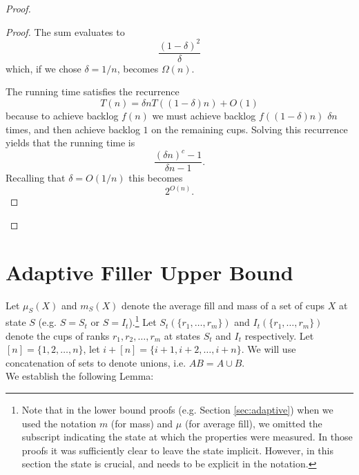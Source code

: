 \documentclass[twocolumn]{article}[10pt]
\begin{document}
\begin{proof}
\begin{proof}
    The sum evaluates to 
    $$\frac{(1-\delta)^2}{\delta}$$
    which, if we chose $\delta = 1/n$, becomes $\Omega(n)$.

    The running time satisfies the recurrence 
    $$T(n) = \delta n T((1-\delta)n) + O(1)$$
    because to achieve backlog $f(n)$ we must achieve backlog
    $f((1-\delta)n)$ $\delta n$ times, and then achieve backlog $1$ on the
    remaining cups. Solving this recurrence yields that the running time is
    $$\frac{(\delta n)^c - 1}{\delta n - 1}.$$
    Recalling that $\delta = O(1/n)$ this becomes 
    $$2^{O(n)}.$$



    
  \end{proof}


\end{proof}

\section{Adaptive Filler Upper Bound}\label{sec:adaptiveUpperBound}
Let $\mu_S(X)$ and $m_S(X)$ denote the average fill and mass of a set of cups $X$
at state $S$ (e.g. $S=S_t$ or $S=I_t$).\footnote{Note that in the lower bound
  proofs (e.g. Section \ref{sec:adaptive}) when we used the notation $m$ (for
  mass) and $\mu$ (for average fill), we omitted the subscript indicating the
  state at which the properties were measured. In those proofs it was
sufficiently clear to leave the state implicit. However, in this section the
state is crucial, and needs to be explicit in the notation.}
Let $S_t(\{r_1, \ldots, r_m\})$ and $I_t(\{r_1,\ldots, r_m\})$ denote the cups
of ranks $r_1, r_2, \ldots, r_m$ at states $S_t$ and $I_t$ respectively.
Let $[n] = \{1,2,\ldots, n\}$, let $i+[n] = \{i+1, i+2, \ldots, i+n\}$. We will
use concatenation of sets to denote unions, i.e. $AB = A\cup B$.\\
We establish the following Lemma:
\end{document}
